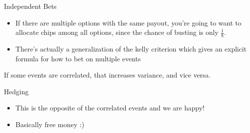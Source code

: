 Independent Bets
\begin{itemize}
    \item If there are multiple options with the same payout, you're going to want to allocate chips among all options, since the chance of busting is only $ \frac{1}{8} $.
    \item There's actually a generalization of the kelly criterion which gives an explicit formula for how to bet on multiple events
\end{itemize}

If some events are correlated, that increases variance, and vice versa.

Hedging
\begin{itemize}
    \item This is the opposite of the correlated events and we are happy!
    \item Basically free money :)
\end{itemize}
